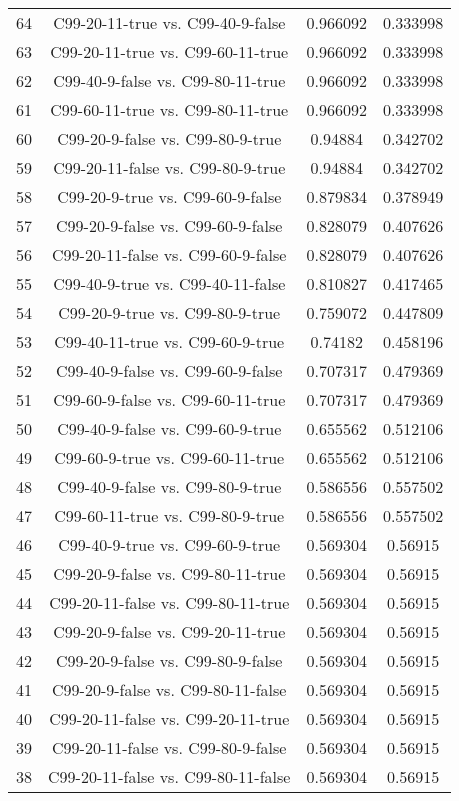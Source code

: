 \documentclass[a4paper,10pt]{article}
\begin{document}
\begin{landscape}
\begin{table}[!htp]
\begin{tabular}{cccc}
64&C99-20-11-true vs. C99-40-9-false&0.966092&0.333998\\
63&C99-20-11-true vs. C99-60-11-true&0.966092&0.333998\\
62&C99-40-9-false vs. C99-80-11-true&0.966092&0.333998\\
61&C99-60-11-true vs. C99-80-11-true&0.966092&0.333998\\
60&C99-20-9-false vs. C99-80-9-true&0.94884&0.342702\\
59&C99-20-11-false vs. C99-80-9-true&0.94884&0.342702\\
58&C99-20-9-true vs. C99-60-9-false&0.879834&0.378949\\
57&C99-20-9-false vs. C99-60-9-false&0.828079&0.407626\\
56&C99-20-11-false vs. C99-60-9-false&0.828079&0.407626\\
55&C99-40-9-true vs. C99-40-11-false&0.810827&0.417465\\
54&C99-20-9-true vs. C99-80-9-true&0.759072&0.447809\\
53&C99-40-11-true vs. C99-60-9-true&0.74182&0.458196\\
52&C99-40-9-false vs. C99-60-9-false&0.707317&0.479369\\
51&C99-60-9-false vs. C99-60-11-true&0.707317&0.479369\\
50&C99-40-9-false vs. C99-60-9-true&0.655562&0.512106\\
49&C99-60-9-true vs. C99-60-11-true&0.655562&0.512106\\
48&C99-40-9-false vs. C99-80-9-true&0.586556&0.557502\\
47&C99-60-11-true vs. C99-80-9-true&0.586556&0.557502\\
46&C99-40-9-true vs. C99-60-9-true&0.569304&0.56915\\
45&C99-20-9-false vs. C99-80-11-true&0.569304&0.56915\\
44&C99-20-11-false vs. C99-80-11-true&0.569304&0.56915\\
43&C99-20-9-false vs. C99-20-11-true&0.569304&0.56915\\
42&C99-20-9-false vs. C99-80-9-false&0.569304&0.56915\\
41&C99-20-9-false vs. C99-80-11-false&0.569304&0.56915\\
40&C99-20-11-false vs. C99-20-11-true&0.569304&0.56915\\
39&C99-20-11-false vs. C99-80-9-false&0.569304&0.56915\\
38&C99-20-11-false vs. C99-80-11-false&0.569304&0.56915\\

\end{tabular}
\end{table}
\end{landscape}
\end{document}
